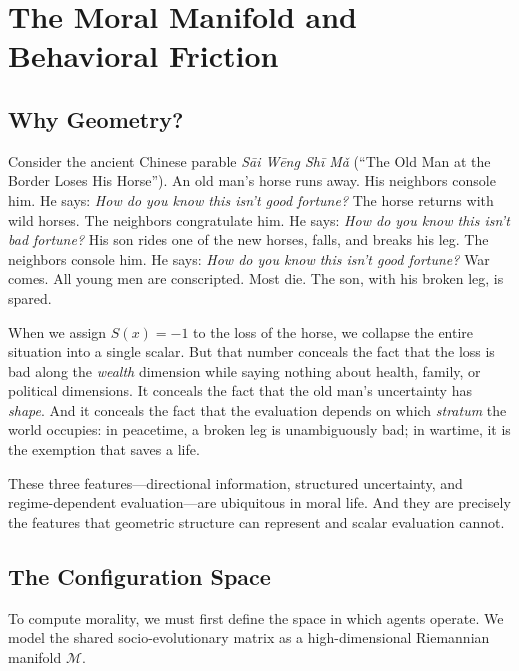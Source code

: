 \documentclass[12pt,letterpaper]{article}
\theoremstyle{definition}
\theoremstyle{remark}
\newcommand{\M}{\mathcal{M}}
\begin{document}
\section{The Moral Manifold and Behavioral Friction}
\label{sec:manifold}

\subsection{Why Geometry?}

Consider the ancient Chinese parable \emph{S\={a}i W\={e}ng Sh\={i} M\v{a}} (``The Old Man at the Border Loses His Horse''). An old man's horse runs away. His neighbors console him. He says: \emph{How do you know this isn't good fortune?} The horse returns with wild horses. The neighbors congratulate him. He says: \emph{How do you know this isn't bad fortune?} His son rides one of the new horses, falls, and breaks his leg. The neighbors console him. He says: \emph{How do you know this isn't good fortune?} War comes. All young men are conscripted. Most die. The son, with his broken leg, is spared.

When we assign $S(x) = -1$ to the loss of the horse, we collapse the entire situation into a single scalar. But that number conceals the fact that the loss is bad along the \emph{wealth} dimension while saying nothing about health, family, or political dimensions. It conceals the fact that the old man's uncertainty has \emph{shape}. And it conceals the fact that the evaluation depends on which \emph{stratum} the world occupies: in peacetime, a broken leg is unambiguously bad; in wartime, it is the exemption that saves a life.

These three features---directional information, structured uncertainty, and regime-dependent evaluation---are ubiquitous in moral life. And they are precisely the features that geometric structure can represent and scalar evaluation cannot.

\subsection{The Configuration Space}

To compute morality, we must first define the space in which agents operate. We model the shared socio-evolutionary matrix as a high-dimensional Riemannian manifold $\M$.
\end{document}
